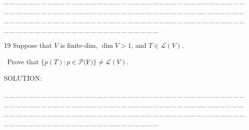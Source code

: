 \documentclass[a4paper, 11pt, UTF8]{article}
\def\Lm{\mathcal{L}}
\def\Po{\mathcal{P}}
\begin{document}
\begin{large}
\par
{\tiny \_\,\_\,\_\,\_\,\_\,\_\,\_\,\_\,\_\,\_\,\_\,\_\,\_\,\_\,\_\,\_\,\_\,\_\,\_\,\_\,\_\,\_\,\_\,\_\,\_\,\_\,\_\,\_\,\_\,\_\,\_\,\_\,\_\,\_\,\_\,\_\,\_\,\_\,\_\,\_\,\_\,\_\,\_\,\_\,\_\,\_\,\_\,\_\,\_\,\_\,\_\,\_\,\_\,\_\,\_\,\_\,\_\,\_\,\_\,\_\,\_\,\_\,\_\,\_\,\_\,\_\,\_\,\_\,\_\,\_\,\_\_\,\_\,\_\,\_\,\_\,\_\,\_\,\_\,\_\,\_\,\_\,\_\,\_\,\_\,\_\,\_\,\_\,\_\,\_\,\_\,\_\,\_\,\_\,\_\,\_\,\_\,\_\,\_\,\_\,\_\,\_\,\_\,\_\,\_\,\_\,\_\,\_\,\_\,\_\,\_\,\_\,\_\,\_\,\_\,\_\,\_\,\_\,\_\,\_\,\_\,\_\,\_\,\_\,\_\,\_\,\_\,\_\,\_\,\_\,\_\,\_\,\_\,\_\,\_\,\_\,\_\,\_\,\_\,\_\,\_\,\_}\par

{\timesbf\Large 19} {\timessl\Large Suppose that $V$ is finite-dim, $\dim V > 1$, and $T\in\Lm(V)$.}\par\quad\,
{\timessl\Large Prove that
$\{p(T):p\in\Po(${\timesbf F}$)\}\neq\Lm(V)$.
}\par
{\timesbf S\footnotesize{OLUTION:}}\par\quad

\par
{\tiny \_\,\_\,\_\,\_\,\_\,\_\,\_\,\_\,\_\,\_\,\_\,\_\,\_\,\_\,\_\,\_\,\_\,\_\,\_\,\_\,\_\,\_\,\_\,\_\,\_\,\_\,\_\,\_\,\_\,\_\,\_\,\_\,\_\,\_\,\_\,\_\,\_\,\_\,\_\,\_\,\_\,\_\,\_\,\_\,\_\,\_\,\_\,\_\,\_\,\_\,\_\,\_\,\_\,\_\,\_\,\_\,\_\,\_\,\_\,\_\,\_\,\_\,\_\,\_\,\_\,\_\,\_\,\_\,\_\,\_\,\_\_\,\_\,\_\,\_\,\_\,\_\,\_\,\_\,\_\,\_\,\_\,\_\,\_\,\_\,\_\,\_\,\_\,\_\,\_\,\_\,\_\,\_\,\_\,\_\,\_\,\_\,\_\,\_\,\_\,\_\,\_\,\_\,\_\,\_\,\_\,\_\,\_\,\_\,\_\,\_\,\_\,\_\,\_\,\_\,\_\,\_\,\_\,\_\,\_\,\_\,\_\,\_\,\_\,\_\,\_\,\_\,\_\,\_\,\_\,\_\,\_\,\_\,\_\,\_\,\_\,\_\,\_\,\_\,\_\,\_\,\_}\par


\end{large}
\end{document}
